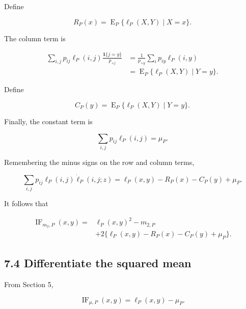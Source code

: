 \documentclass[
  11pt]{article}
\begin{document}
Define

\begin{equation}
R_P(x)
=\operatorname E_P\{\ell_P(X,Y)\mid X=x\}.
\end{equation}

The column term is

\begin{equation}
\begin{aligned}
\sum_{i,j}p_{ij}\ell_P(i,j)
\frac{\mathbf 1\{j=y\}}{p_{+j}}
&=\frac{1}{p_{+y}}\sum_i p_{iy}\ell_P(i,y)\\
&=\operatorname E_P\{\ell_P(X,Y)\mid Y=y\}.
\end{aligned}
\end{equation}

Define

\begin{equation}
C_P(y)
=\operatorname E_P\{\ell_P(X,Y)\mid Y=y\}.
\end{equation}

Finally, the constant term is

\begin{equation}
\sum_{i,j}p_{ij}\ell_P(i,j)=\mu_P.
\end{equation}

Remembering the minus signs on the row and column terms,

\begin{equation}
\boxed{
\sum_{i,j}p_{ij}\ell_P(i,j)\dot\ell_P(i,j;z)
=\ell_P(x,y)-R_P(x)-C_P(y)+\mu_P.
}
\end{equation}

It follows that

\begin{equation}
\boxed{
\begin{aligned}
\operatorname{IF}_{m_2,P}(x,y)
={}&\ell_P(x,y)^2-m_{2,P}\\
&+2\{\ell_P(x,y)-R_P(x)-C_P(y)+\mu_P\}.
\end{aligned}
}
\end{equation}

\subsection{7.4 Differentiate the squared
mean}\label{differentiate-the-squared-mean}

From Section 5,

\begin{equation}
\operatorname{IF}_{\mu,P}(x,y)
=\ell_P(x,y)-\mu_P.
\end{equation}
\end{document}
